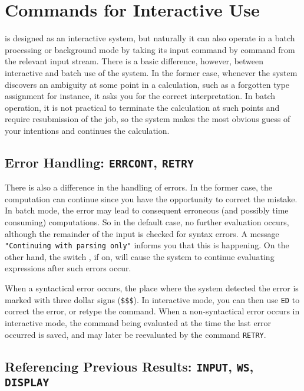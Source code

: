 \chapter{Commands for Interactive Use}
\label{interactive}

{\REDUCE} is designed as an interactive system, but naturally it can
also operate in a batch processing or background mode by taking its
input command by command from the relevant input stream.  There is a
basic difference, however, between interactive and batch use of the
system.  In the former case, whenever the system discovers an
ambiguity at some point in a calculation, such as a forgotten type
assignment for instance, it asks you for the correct interpretation.
In batch operation, it is not practical to terminate the calculation
at such points and require resubmission of the job, so the system
makes the most obvious guess of your intentions and continues the
calculation.

\section{Error Handling:
  \texttt{\small ERRCONT}, \texttt{\small RETRY}}

\hypertarget{switch:ERRCONT}{}
There is also a difference in the handling of errors.  In the former
case, the computation can continue since you have the opportunity to
correct the mistake.  In batch mode, the error may lead to consequent
erroneous (and possibly time consuming) computations.  So in the
default case, no further evaluation occurs, although the remainder of
the input is checked for syntax errors.  A message \texttt{"Continuing
  with parsing only"} informs you that this is happening.  On the
other hand, the switch , if on,
will cause the system to continue evaluating expressions after such
errors occur.

\hypertarget{command:RETRY}{}
When a syntactical error occurs, the place where the system detected
the error is marked with three dollar signs (\texttt{\$\$\$}). In
interactive mode, you can then use \texttt{ED} to correct
the error, or retype the command.  When a non-syntactical error occurs
in interactive mode, the command being evaluated at the time the last
error occurred is saved, and may later be reevaluated by the command
\texttt{RETRY}.

\section{Referencing Previous Results:
  \texttt{\small INPUT}, \texttt{\small WS}, \texttt{\small DISPLAY}}

